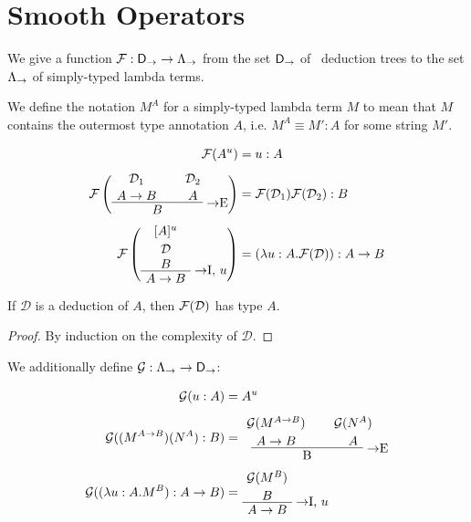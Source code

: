 \section{Smooth Operators}

We give a function $\mathcal{F}: \mathsf{D}_\to \to \Lambda_\to$ from the set $\mathsf{D}_\to$
of \implnpi\ deduction trees to the set $\Lambda_\to$ of simply-typed lambda terms.

\begin{definition}
We define the notation $M^{A}$ for a simply-typed lambda term $M$ to mean that
$M$ contains the outermost type annotation $A$, i.e. $M^A \equiv M':A$ for some
string $M'$.
\end{definition}

\begin{alignat*}{2}
\chmap(A^u) &= u: A \\[0.5em]
\chmap\left(
  \AxiomC{$\mathcal{D}_1$}
  \noLine
  \UnaryInfC{$A \to B$}
  \AxiomC{$\mathcal{D}_2$}
  \noLine
  \UnaryInfC{$A$}
  \RightLabel{$\to$E}
  \BinaryInfC{$B$}
  \DisplayProof
\right) &= \chmap(\mathcal{D}_1) \chmap(\mathcal{D}_2): B \\[0.5em]
\chmap\left(
  \AxiomC{$[A]^u$}
  \noLine
  \UnaryInfC{$\mathcal{D}$}
  \noLine
  \UnaryInfC{$B$}
  \RightLabel{$\to$I, $u$}
  \UnaryInfC{$A \to B$}
  \DisplayProof
\right) &= (\lambda u: A.\chmap(\mathcal{D})): A \to B
\end{alignat*}

\begin{proposition}
If $\mathcal{D}$ is a deduction of $A$, then $\mathcal{F}(\mathcal{D})$ has type $A$.
\end{proposition}

\begin{proof}
By induction on the complexity of $\mathcal{D}$.
\end{proof}

We additionally define $\mathcal{G}: \Lambda_\to \to \mathsf{D}_\to$:

\begin{alignat*}{2}
\chmapanta(u: A) &= A^u \\[0.5em]
\chmapanta((M^{A \to B})(N^A): B) &=
  \AxiomC{$\chmapanta(M^{A \to B})$}
  \noLine
  \UnaryInfC{$A \to B$}
  \AxiomC{$\chmapanta(N^A)$}
  \noLine
  \UnaryInfC{$A$}
  \RightLabel{$\to$E}
  \BinaryInfC{B}
  \DisplayProof \\[0.5em]
\chmapanta((\lambda u:A.M^B):A \to B) &=
  \AxiomC{$\chmapanta(M^B)$}
  \noLine
  \UnaryInfC{$B$}
  \RightLabel{$\to$I, $u$}
  \UnaryInfC{$A \to B$}
  \DisplayProof
\end{alignat*}

